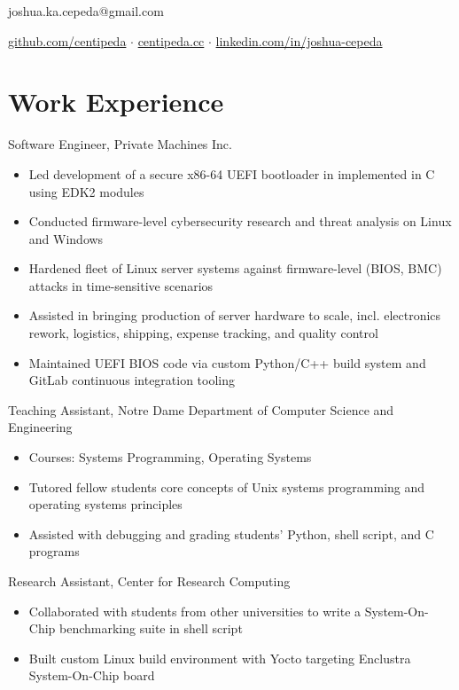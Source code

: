 \documentclass[11pt]{article}
\newcommand{\listing}[2]{#1 \hfill \strong{#2}}
\newcommand{\details}[1]{
    \vspace{-10pt}
    \begin{itemize}
        \setlength\itemsep{-4pt}
        #1
    \end{itemize}
}
\newcommand{\sect}[1]{\vspace{-15pt}\section*{#1}\vspace{-10pt}}
\begin{document}
    \begin{center}
        {\Huge {}}

        \vspace{5pt}

        joshua.ka.cepeda@gmail.com

        \href{https://github.com/centipeda}{github.com/centipeda} 
        $\cdot$ \href{https://centipeda.cc}{centipeda.cc} 
        $\cdot$ \href{https://linkedin.com/in/joshua-cepeda}{linkedin.com/in/joshua-cepeda}
    \end{center}
    \vspace{-10pt}
    \hrulefill
    \vspace{-15pt}


    \vspace{20pt}

    \sect{Work Experience}
    \listing{Software Engineer, Private Machines Inc.}{2022 - Present}
    \details{
        \item Led development of a secure x86-64 UEFI bootloader in implemented in C using EDK2 modules
        \item Conducted firmware-level cybersecurity research and threat analysis on Linux and Windows
        \item Hardened fleet of Linux server systems against firmware-level (BIOS, BMC) attacks in time-sensitive scenarios
        \item Assisted in bringing production of server hardware to scale, incl. electronics rework, logistics, shipping, expense tracking, and quality control
        \item Maintained UEFI BIOS code via custom Python/C++ build system and GitLab continuous integration tooling
    }

    \listing{Teaching Assistant, Notre Dame Department of Computer Science and Engineering}{2021 - 2022}
    \details{
        \item Courses: Systems Programming, Operating Systems
        \item Tutored fellow students core concepts of Unix systems programming and operating systems principles
        \item Assisted with debugging and grading students' Python, shell script, and C programs
    }

    \listing{Research Assistant, Center for Research Computing}{2019 - 2021}
    \details{
        \item Collaborated with students from other universities to write a System-On-Chip benchmarking suite in shell script
        \item Built custom Linux build environment with Yocto targeting Enclustra System-On-Chip board
    }
\end{document}
